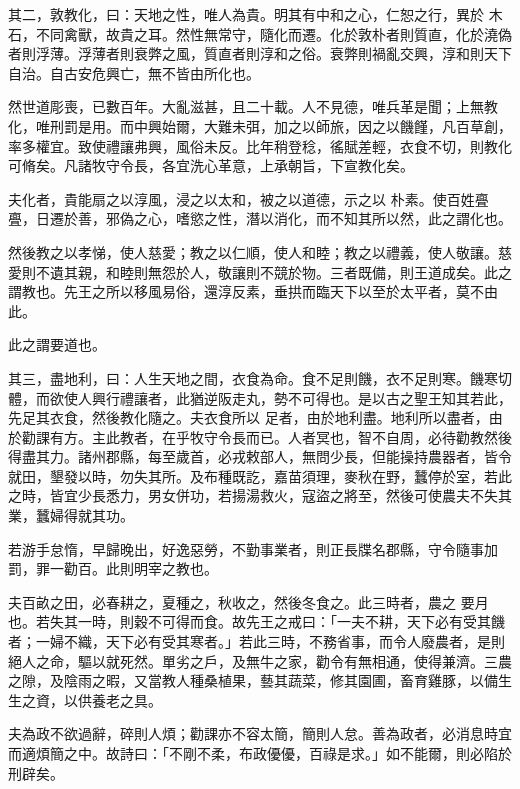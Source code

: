 \begin{pinyinscope}
 其二，敦教化，曰：天地之性，唯人為貴。明其有中和之心，仁恕之行，異於
 木石，不同禽獸，故貴之耳。然性無常守，隨化而遷。化於敦朴者則質直，化於澆偽者則浮薄。浮薄者則衰弊之風，質直者則淳和之俗。衰弊則禍亂交興，淳和則天下自治。自古安危興亡，無不皆由所化也。



 然世道彫喪，已數百年。大亂滋甚，且二十載。人不見德，唯兵革是聞；上無教化，唯刑罰是用。而中興始爾，大難未弭，加之以師旅，因之以饑饉，凡百草創，率多權宜。致使禮讓弗興，風俗未反。比年稍登稔，徭賦差輕，衣食不切，則教化可脩矣。凡諸牧守令長，各宜洗心革意，上承朝旨，下宣教化矣。



 夫化者，貴能扇之以淳風，浸之以太和，被之以道德，示之以
 朴素。使百姓亹亹，日遷於善，邪偽之心，嗜慾之性，潛以消化，而不知其所以然，此之謂化也。



 然後教之以孝悌，使人慈愛；教之以仁順，使人和睦；教之以禮義，使人敬讓。慈愛則不遺其親，和睦則無怨於人，敬讓則不競於物。三者既備，則王道成矣。此之謂教也。先王之所以移風易俗，還淳反素，垂拱而臨天下以至於太平者，莫不由此。



 此之謂要道也。



 其三，盡地利，曰：人生天地之間，衣食為命。食不足則饑，衣不足則寒。饑寒切體，而欲使人興行禮讓者，此猶逆阪走丸，勢不可得也。是以古之聖王知其若此，先足其衣食，然後教化隨之。夫衣食所以
 足者，由於地利盡。地利所以盡者，由於勸課有方。主此教者，在乎牧守令長而已。人者冥也，智不自周，必待勸教然後得盡其力。諸州郡縣，每至歲首，必戎敕部人，無問少長，但能操持農器者，皆令就田，墾發以時，勿失其所。及布種既訖，嘉苗須理，麥秋在野，蠶停於室，若此之時，皆宜少長悉力，男女併功，若揚湯救火，寇盜之將至，然後可使農夫不失其業，蠶婦得就其功。



 若游手怠惰，早歸晚出，好逸惡勞，不勤事業者，則正長牒名郡縣，守令隨事加罰，罪一勸百。此則明宰之教也。



 夫百畝之田，必春耕之，夏種之，秋收之，然後冬食之。此三時者，農之
 要月也。若失其一時，則穀不可得而食。故先王之戒曰：「一夫不耕，天下必有受其饑者；一婦不織，天下必有受其寒者。」若此三時，不務省事，而令人廢農者，是則絕人之命，驅以就死然。單劣之戶，及無牛之家，勸令有無相通，使得兼濟。三農之隙，及陰雨之暇，又當教人種桑植果，藝其蔬菜，修其園圃，畜育雞豚，以備生生之資，以供養老之具。



 夫為政不欲過辭，碎則人煩；勸課亦不容太簡，簡則人怠。善為政者，必消息時宜而適煩簡之中。故詩曰：「不剛不柔，布政優優，百祿是求。」如不能爾，則必陷於刑辟矣。




\end{pinyinscope}
